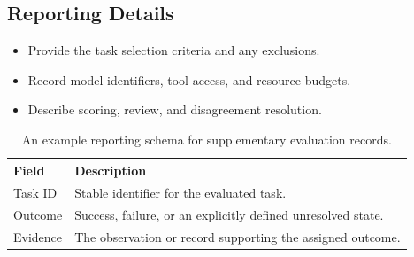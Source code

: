 \documentclass[11pt,a4paper]{article}
\begin{document}
\subsection{Reporting Details}
\begin{itemize}
  \item Provide the task selection criteria and any exclusions.
  \item Record model identifiers, tool access, and resource budgets.
  \item Describe scoring, review, and disagreement resolution.
\end{itemize}

\begin{table}[htbp]
  \centering
  \begin{tabularx}{\linewidth}{@{}lX@{}}
    \toprule
    Field & Description \\
    \midrule
    Task ID & Stable identifier for the evaluated task. \\
    Outcome & Success, failure, or an explicitly defined unresolved state. \\
    Evidence & The observation or record supporting the assigned outcome. \\
    \bottomrule
  \end{tabularx}
  \caption{An example reporting schema for supplementary evaluation records.}
  \label{tab:schema}
\end{table}
\end{document}

